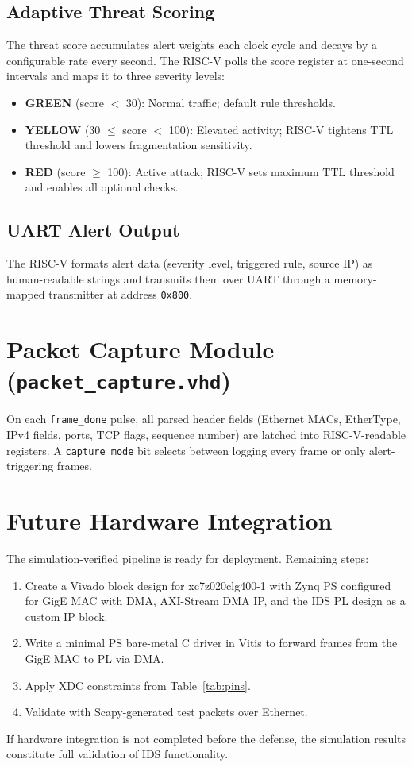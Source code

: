 \subsection{Adaptive Threat Scoring}
The threat score accumulates alert weights each clock cycle and decays by a configurable rate every second. The RISC-V polls the score register at one-second intervals and maps it to three severity levels:

\begin{itemize}
	\item \textbf{GREEN} (score $<$ 30): Normal traffic; default rule thresholds.
	\item \textbf{YELLOW} (30 $\leq$ score $<$ 100): Elevated activity; RISC-V tightens TTL threshold and lowers fragmentation sensitivity.
	\item \textbf{RED} (score $\geq$ 100): Active attack; RISC-V sets maximum TTL threshold and enables all optional checks.
\end{itemize}

\subsection{UART Alert Output}
The RISC-V formats alert data (severity level, triggered rule, source IP) as human-readable strings and transmits them over UART through a memory-mapped transmitter at address \texttt{0x800}.

\section{Packet Capture Module (\texttt{packet\_capture.vhd})}
On each \texttt{frame\_done} pulse, all parsed header fields (Ethernet MACs, EtherType, IPv4 fields, ports, TCP flags, sequence number) are latched into RISC-V-readable registers. A \texttt{capture\_mode} bit selects between logging every frame or only alert-triggering frames.

\section{Future Hardware Integration}
The simulation-verified pipeline is ready for deployment. Remaining steps:
\begin{enumerate}
	\item Create a Vivado block design for xc7z020clg400-1 with Zynq PS configured for GigE MAC with DMA, AXI-Stream DMA IP, and the IDS PL design as a custom IP block.
	\item Write a minimal PS bare-metal C driver in Vitis to forward frames from the GigE MAC to PL via DMA.
	\item Apply XDC constraints from Table~\ref{tab:pins}.
	\item Validate with Scapy-generated test packets over Ethernet.
\end{enumerate}
If hardware integration is not completed before the defense, the simulation results constitute full validation of IDS functionality.